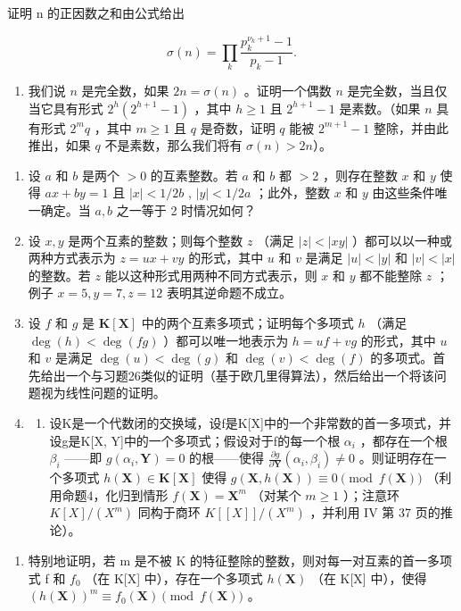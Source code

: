 证明 n 的正因数之和由公式给出

\[
\sigma (n) = \prod_ {k} \frac {p _ {k} ^ {\nu_ {k} + 1} - 1}{p _ {k} - 1}.
\]

\begin{enumerate}
\def\labelenumi{\alph{enumi})}
\setcounter{enumi}{1}
\tightlist
\item
  我们说 \(n\) 是完全数，如果 \(2n = \sigma(n)\) 。证明一个偶数 \(n\) 是完全数，当且仅当它具有形式 \(2^h(2^{h+1} - 1)\) ，其中 \(h \geqslant 1\) 且 \(2^{h+1} - 1\) 是素数。（如果 \(n\) 具有形式 \(2^m q\) ，其中 \(m \geqslant 1\) 且 \(q\) 是奇数，证明 \(q\) 能被 \(2^{m+1} - 1\) 整除，并由此推出，如果 \(q\) 不是素数，那么我们将有 \(\sigma(n) > 2n\)）。
\end{enumerate}

\begin{enumerate}
\def\labelenumi{\arabic{enumi})}
\setcounter{enumi}{24}
\item
  设 \(a\) 和 \(b\) 是两个 \(> 0\) 的互素整数。若 \(a\) 和 \(b\) 都 \(> 2\) ，则存在整数 \(x\) 和 \(y\) 使得 \(ax + by = 1\) 且 \(|x| < 1/2b\) , \(|y| < 1/2a\) ；此外，整数 \(x\) 和 \(y\) 由这些条件唯一确定。当 \(a, b\) 之一等于 2 时情况如何？
\item
  设 \(x, y\) 是两个互素的整数；则每个整数 \(z\) （满足 \(|z| < |xy|\) ）都可以以一种或两种方式表示为 \(z = ux + vy\) 的形式，其中 \(u\) 和 \(v\) 是满足 \(|u| < |y|\) 和 \(|v| < |x|\) 的整数。若 \(z\) 能以这种形式用两种不同方式表示，则 \(x\) 和 \(y\) 都不能整除 \(z\) ；例子 \(x = 5, y = 7, z = 12\) 表明其逆命题不成立。
\item
  设 \(f\) 和 \(g\) 是 \(\mathbf{K}[\mathbf{X}]\) 中的两个互素多项式；证明每个多项式 \(h\) （满足 \(\deg(h) < \deg(fg)\) ）都可以唯一地表示为 \(h = uf + vg\) 的形式，其中 \(u\) 和 \(v\) 是满足 \(\deg(u) < \deg(g)\) 和 \(\deg(v) < \deg(f)\) 的多项式。首先给出一个与习题26类似的证明（基于欧几里得算法），然后给出一个将该问题视为线性问题的证明。
\item
  \begin{enumerate}
  \def\labelenumii{\alph{enumii})}
  \tightlist
  \item
    设K是一个代数闭的交换域，设f是K{[}X{]}中的一个非常数的首一多项式，并设g是K{[}X, Y{]}中的一个多项式；假设对于f的每一个根 \(\alpha_{i}\) ，都存在一个根 \(\beta_{i}\) ——即 \(g(\alpha_{i}, \mathbf{Y}) = 0\) 的根——使得 \(\frac{\partial g}{\partial \mathbf{Y}} (\alpha_{i}, \beta_{i}) \neq 0\) 。则证明存在一个多项式 \(h(\mathbf{X}) \in \mathbf{K}[\mathbf{X}]\) 使得 \(g(\mathbf{X}, h(\mathbf{X})) \equiv 0 \pmod{f(\mathbf{X})}\) （利用命题4，化归到情形 \(f(\mathbf{X}) = \mathbf{X}^{m}\) （对某个 \(m \geqslant 1\) ）；注意环 \(K[X]/(X^{m})\) 同构于商环 \(K[[X]]/(X^{m})\) ，并利用 IV 第 37 页的推论）。
  \end{enumerate}
\end{enumerate}

\begin{enumerate}
\def\labelenumi{\alph{enumi})}
\setcounter{enumi}{1}
\tightlist
\item
  特别地证明，若 m 是不被 K 的特征整除的整数，则对每一对互素的首一多项式 f 和 \(f_{0}\) （在 K{[}X{]} 中），存在一个多项式 \(h(\mathbf{X})\) （在 K{[}X{]} 中），使得 \((h(\mathbf{X}))^{m} \equiv f_{0}(\mathbf{X}) \pmod{f(\mathbf{X})}\) 。
\end{enumerate}


